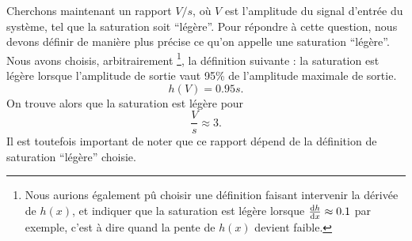 Cherchons maintenant un rapport $V/s$, où $V$ est
l'amplitude du signal d'entrée du système, tel que
la saturation soit ``légère''. Pour répondre à cette question,
nous devons définir de manière plus précise ce qu'on appelle
une saturation ``légère''. Nous avons choisis, arbitrairement
\footnote{Nous aurions également pû choisir une définition
faisant intervenir la dérivée de $h(x)$, et indiquer que la
saturation est légère lorsque $\frac{\operatorname{d}\! h}{\operatorname{d}\! x} \approx 0.1$ par exemple,
c'est à dire quand la pente de $h(x)$ devient faible.}, 
la définition suivante : la saturation est légère
lorsque l'amplitude de sortie vaut 95\% de l'amplitude
maximale de sortie.
\[ h(V) = 0.95s. \]
On trouve alors que la saturation est légère pour 
\[ \frac{V}{s} \approx 3. \]
Il est toutefois important de noter que ce rapport
dépend de la définition de saturation ``légère'' choisie.
